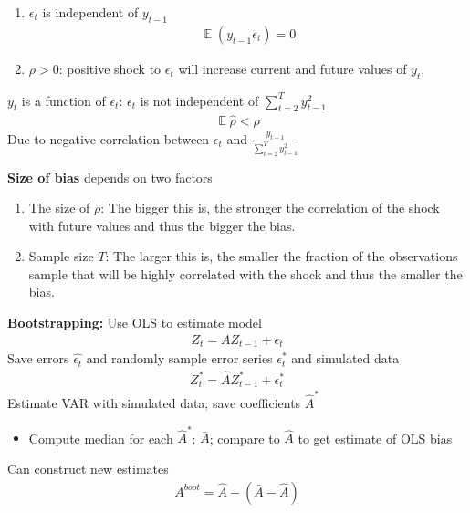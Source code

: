 \documentclass{beamer}
\begin{document}
\begin{frame}
 \begin{enumerate}
   \item $\epsilon_t$ is independent of $y_{t-1}$ 
   \begin{align}
    \mathop{\mathbb{E}}(y_{t-1}\epsilon_t)= 0  
 \end{align}
   \item $\rho>0$: positive shock to $\epsilon_t$ will increase current and future values of $y_t$.
 \end{enumerate}
 \medskip
 $y_t$ is a function of $\epsilon_t$: $\epsilon_t$ is not independent of $\sum^T_{t=2}y^2_{t-1}$
 \begin{align}
     \mathop{\mathbb{E}} \hat{\rho}<\rho
   \end{align} 
 Due to negative correlation between $\epsilon_t$ and $\frac{y_{t-1}}{\sum_{t=2}^T y^2_{t-1}}$ 
\end{frame}

\begin{frame}
 \textbf{Size of bias} depends on two factors \medskip
 \begin{enumerate}
  \item The size of $\rho$: The bigger this is, the stronger the correlation of the shock with future values and thus the bigger the bias.
  \item Sample size $T$: The larger this is, the smaller the fraction of the observations sample that will be highly correlated with the shock and thus the smaller the bias.
\end{enumerate}
\end{frame}

\begin{frame}
  \textbf{Bootstrapping:} 
   Use OLS to estimate model 
   \begin{align}
     Z_t= AZ_{t-1} + \epsilon_t
   \end{align}
   \medskip
   Save errors $\hat{\epsilon_t}$ and randomly sample error series $\epsilon^*_t$ and simulated data
   \begin{align}
     Z^*_t= \hat{A}Z^*_{t-1} + \epsilon^*_t
   \end{align}
   \medskip
    Estimate VAR with simulated data; save coefficients $\hat{A}^*$
    \begin{itemize}
      \item Compute median for each $\hat{A}^*$: $\bar{A}$; compare to $\hat{A}$ to get estimate of OLS bias
    \end{itemize}
    \medskip
    Can construct new estimates 
    \begin{align}
      A^{boot} = \hat{A}-(\bar{A}-\hat{A})
    \end{align}  
\end{frame}
\end{document}
